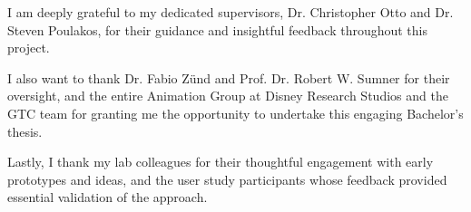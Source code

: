 I am deeply grateful to my dedicated supervisors, Dr. Christopher Otto and
Dr. Steven Poulakos, for their guidance and insightful feedback throughout
this project.

I also want to thank Dr. Fabio Zünd and Prof. Dr. Robert W. Sumner
for their oversight, and the entire Animation Group at Disney Research Studios and the GTC team  for granting me the opportunity
to undertake this engaging Bachelor’s thesis.

Lastly, I thank my lab colleagues for their thoughtful engagement with
early prototypes and ideas, and the user study participants whose feedback
provided essential validation of the approach.